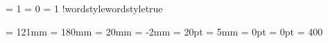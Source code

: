 \def\!newfam{\alloc@8\fam\chardef\sixt@@n}       %
\def\!newtoks{\alloc@5\toks\toksdef\@cclvi}     %
\recoverAtCode
\pageno = 1                                           %
\globaldefs = 0                                        %
\tracingstats = 1                                          %
%
\newif\if!wordstyle\!wordstyletrue                  %
\def\useTTfonts{\global\!wordstyletrue}
\def\useCMfonts{\global\!wordstylefalse}

\magnification{}  %
\hsize        = 121mm     %
\vsize        = 180mm     %
\hoffset      =  20mm     %
\voffset      =  -2mm     %
\topskip      =  20pt     %
\parindent    =   5mm     %
\parskip      =   0pt     %
\mathsurround =   0pt     %
\tolerance    =   400     %

